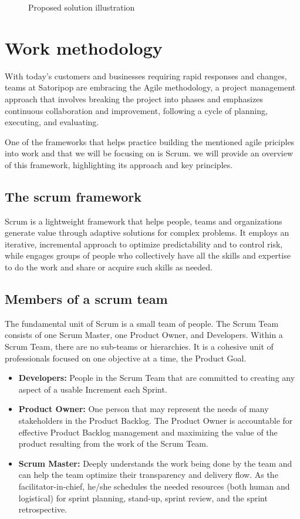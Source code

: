\begin{figure}[hbt!]
      \centering
      
      \caption{Proposed solution illustration}
      \label{solution}
\end{figure}

\section{Work methodology}
With today’s customers and businesses requiring rapid responses and changes, teams at Satoripop are embracing
the Agile methodology, a project management approach that involves breaking the project into phases
and emphasizes continuous collaboration and improvement, following a cycle of planning, executing,
and evaluating.

One of the frameworks that helps practice building the mentioned agile priciples into work and that we will
be focusing on is Scrum. we will provide an overview of this framework, highlighting its approach and
key principles.

\subsection{The scrum framework}
Scrum is a lightweight framework that helps people, teams and organizations generate value through adaptive
solutions for complex problems. It employs an iterative, incremental approach to optimize predictability
and to control risk, while engages groups of people who collectively have all the skills and expertise
to do the work and share or acquire such skills as needed.

\subsection{Members of a scrum team }
The fundamental unit of Scrum is a small team of people. The Scrum Team consists of
one Scrum Master, one Product Owner, and Developers. Within a Scrum Team, there are no sub-teams
or hierarchies. It is a cohesive unit of professionals focused on one objective at a time,
the Product Goal. \cite{scrumguides}

\begin{itemize}
      \item \textbf{Developers:} People in the Scrum Team that are committed to creating any aspect
            of a usable Increment each Sprint.
      \item \textbf{Product Owner:} One person that may represent the needs of many stakeholders
            in the Product Backlog. The Product Owner is accountable for effective Product Backlog management
            and maximizing the value of the product resulting from the work of the Scrum Team.
      \item \textbf{Scrum Master:} Deeply understands the work being done by the team and
            can help the team optimize their transparency and delivery flow. As the facilitator-in-chief,
            he/she schedules the needed resources (both human and logistical) for sprint planning, stand-up,
            sprint review, and the sprint retrospective.
\end{itemize}
\raggedbottom

